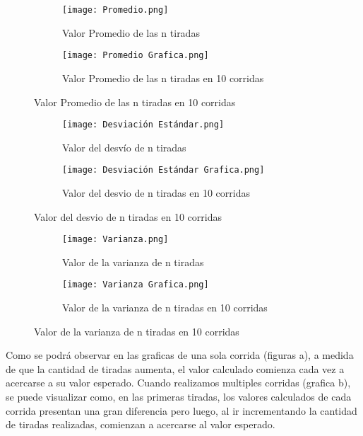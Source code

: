 \documentclass{article}
\begin{document}
    \begin{figure}[H]
        \centering
        \begin{subfigure}{0.45\linewidth}
            \texttt{[image: Promedio.png]}
            \caption{Valor Promedio de las n tiradas}
            \label{fig:grafico}
        \end{subfigure}
        \begin{subfigure}{0.45\linewidth}
            \texttt{[image: Promedio Grafica.png]}
            \caption{Valor Promedio de las n tiradas en 10 corridas}
            \label{fig:grafico}
        \end{subfigure}
    \end{figure}

    \begin{figure}[H]
        \centering
        \begin{subfigure}{0.45\linewidth}
            \texttt{[image: Desviación Estándar.png]}
            \caption{Valor del desvío de n tiradas}
            \label{fig:grafico}
        \end{subfigure}
        \begin{subfigure}{0.45\linewidth}
            \texttt{[image: Desviación Estándar Grafica.png]}
            \caption{Valor del desvio de n tiradas en 10 corridas}
            \label{fig:grafico}
        \end{subfigure}
    \end{figure}
    
    \begin{figure} [H]
        \centering
        \begin{subfigure}[h]{0.45\linewidth}
            \texttt{[image: Varianza.png]}
            \caption{Valor de la varianza de n tiradas}
            \label{fig:grafico}
        \end{subfigure}
        \begin{subfigure}[h]{0.45\linewidth}
            \texttt{[image: Varianza Grafica.png]}
            \caption{Valor de la varianza de n tiradas en 10 corridas}
            \label{fig:grafico}
        \end{subfigure}
    \end{figure}

Como se podrá observar en las graficas de una sola corrida (figuras a), a medida de que la cantidad de tiradas aumenta, el valor calculado comienza cada vez a acercarse a su valor esperado. Cuando realizamos  multiples corridas (grafica b), se puede visualizar como, en las primeras tiradas, los valores calculados de cada corrida presentan una gran diferencia pero luego, al ir incrementando la cantidad de  tiradas realizadas, comienzan a acercarse al valor esperado.
    
\end{document}
